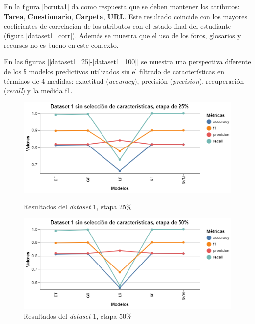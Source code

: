 En la figura \ref{boruta1} da como respuesta que se deben mantener los atributos: \textbf{Tarea}, \textbf{Cuestionario}, 
\textbf{Carpeta}, \textbf{URL}. Este resultado coincide con los mayores coeficientes de correlación de los atributos con el estado final del estudiante (figura \ref{dataset1_corr}). 
Además se muestra que el uso de los foros, glosarios y recursos no es bueno en este contexto.

En las figuras [\ref{dataset1_25}-\ref{dataset1_100}] se muestra una perspectiva diferente de los 5 modelos predictivos utilizados sin el filtrado de características
en términos de 4 medidas: exactitud (\textit{accuracy}), precisión (\textit{precision}), recuperación (\textit{recall}) y la medida f1.   





\begin{figure}[htbp]
    \centering
    \begin{minipage}[t]{0.50\textwidth}
        \centering
        \includegraphics[width = \textwidth]{Graphics/dataset_1_25.png}
        \caption{Resultados del \textit{dataset} 1, etapa 25\%}
        \label{dataset1_25}
    \end{minipage}\hfill
    \begin{minipage}[t]{0.50\textwidth}
        \centering
        \includegraphics[width = \textwidth]{Graphics/dataset_1_50.png}
        \caption{Resultados del \textit{dataset} 1, etapa 50\%}
        \label{dataset1_50}
    \end{minipage}
\end{figure}

